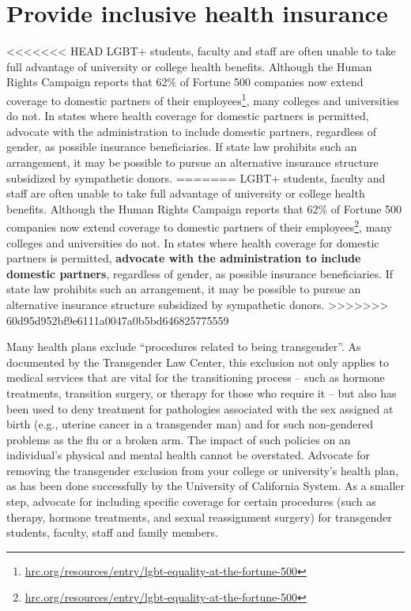 \section {Provide inclusive health insurance}
\label{health-insurance}
<<<<<<< HEAD
LGBT+ students, faculty and staff are often unable to take full advantage of university or college health benefits.  Although the Human Rights Campaign reports that 62\% of Fortune 500 companies now extend coverage to domestic partners of their employees\footnote{\href{http://www.hrc.org/resources/entry/lgbt-equality-at-the-fortune-500}{hrc.org/resources/entry/lgbt-equality-at-the-fortune-500}}, many colleges and universities do not.  In states where health coverage for domestic partners is permitted, advocate with the administration to include domestic partners, regardless of gender, as possible insurance beneficiaries. If state law prohibits such an arrangement, it may be possible to pursue an alternative insurance structure subsidized by sympathetic donors. 
=======
LGBT+ students, faculty and staff are often unable to take full advantage of university or college health benefits.  Although the Human Rights Campaign reports that 62\% of Fortune 500 companies now extend coverage to domestic partners of their employees\footnote{\href{http://www.hrc.org/resources/entry/lgbt-equality-at-the-fortune-500}{hrc.org/resources/entry/lgbt-equality-at-the-fortune-500}}, many colleges and universities do not.  In states where health coverage for domestic partners is permitted, \textbf{advocate with the administration to include domestic partners}, regardless of gender, as possible insurance beneficiaries. If state law prohibits such an arrangement, it may be possible to pursue an alternative insurance structure subsidized by sympathetic donors. 
>>>>>>> 60d95d952bf9e6111a0047a0b5bd646825775559

Many health plans exclude ``procedures related to being transgender''. As documented by the Transgender Law Center, this exclusion not only applies to medical services that are vital for the transitioning process -- such as hormone treatments, transition surgery, or therapy for those who require it -- but also has been used to deny treatment for pathologies associated with the sex assigned at birth (e.g., uterine cancer in a transgender man) and for such non-gendered problems as the flu or a broken arm. The impact of such policies on an individual's physical and mental health cannot be overstated. Advocate for removing the transgender exclusion from your college or university's health plan, as has been done successfully by the University of California System.  As a smaller step, advocate for including specific coverage for certain procedures (such as therapy, hormone treatments, and sexual reassignment surgery) for transgender students, faculty, staff and family members.

